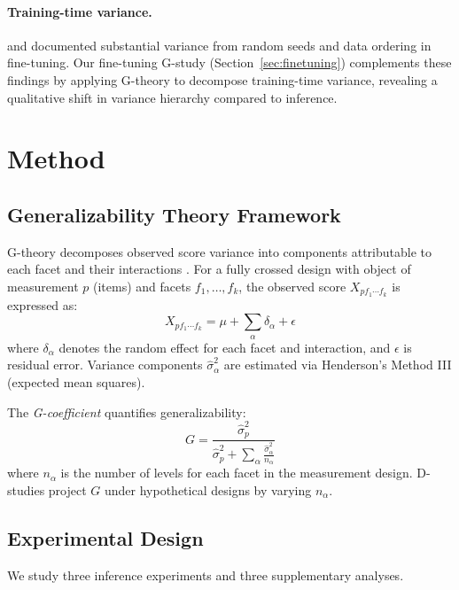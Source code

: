 \documentclass[letterpaper,11pt]{article}
\begin{document}
\paragraph{Training-time variance.}
\citet{dodge2020fine} and \citet{sellam2022multiberts} documented substantial variance from random seeds and data ordering in fine-tuning.
Our fine-tuning G-study (Section~\ref{sec:finetuning}) complements these findings by applying G-theory to decompose training-time variance, revealing a qualitative shift in variance hierarchy compared to inference.

\section{Method}
\label{sec:method}

\subsection{Generalizability Theory Framework}

G-theory decomposes observed score variance into components attributable to each facet and their interactions \citep{brennan2001generalizability}.
For a fully crossed design with object of measurement $p$ (items) and facets $f_1, \ldots, f_k$, the observed score $X_{pf_1\cdots f_k}$ is expressed as:
\begin{equation}
X_{pf_1\cdots f_k} = \mu + \sum_{\alpha} \delta_\alpha + \epsilon
\end{equation}
where $\delta_\alpha$ denotes the random effect for each facet and interaction, and $\epsilon$ is residual error.
Variance components $\hat{\sigma}^2_\alpha$ are estimated via Henderson's Method III (expected mean squares).

The \emph{G-coefficient} quantifies generalizability:
\begin{equation}
G = \frac{\hat{\sigma}^2_p}{\hat{\sigma}^2_p + \sum_\alpha \frac{\hat{\sigma}^2_\alpha}{n_\alpha}}
\end{equation}
where $n_\alpha$ is the number of levels for each facet in the measurement design.
D-studies project $G$ under hypothetical designs by varying $n_\alpha$.

\subsection{Experimental Design}

We study three inference experiments and three supplementary analyses.
\end{document}
